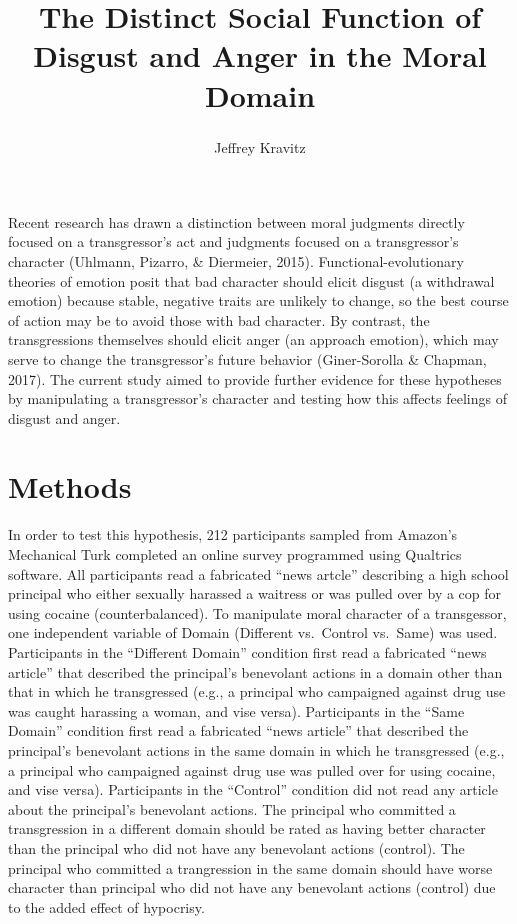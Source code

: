 \documentclass[man]{apa6}
\title{The Distinct Social Function of Disgust and Anger in the Moral Domain}
\author{Jeffrey Kravitz\textsuperscript{ }}
\date{}
\affiliation{
\vspace{0.5cm}
\textsuperscript{ } CUNY Brooklyn College}
\begin{document}
\maketitle

Recent research has drawn a distinction between moral judgments directly
focused on a transgressor's act and judgments focused on a
transgressor's character (Uhlmann, Pizarro, \& Diermeier, 2015).
Functional-evolutionary theories of emotion posit that bad character
should elicit disgust (a withdrawal emotion) because stable, negative
traits are unlikely to change, so the best course of action may be to
avoid those with bad character. By contrast, the transgressions
themselves should elicit anger (an approach emotion), which may serve to
change the transgressor's future behavior (Giner-Sorolla \& Chapman,
2017). The current study aimed to provide further evidence for these
hypotheses by manipulating a transgressor's character and testing how
this affects feelings of disgust and anger.

\section{Methods}\label{methods}

In order to test this hypothesis, 212 participants sampled from Amazon's
Mechanical Turk completed an online survey programmed using Qualtrics
software. All participants read a fabricated \enquote{news artcle}
describing a high school principal who either sexually harassed a
waitress or was pulled over by a cop for using cocaine
(counterbalanced). To manipulate moral character of a transgessor, one
independent variable of Domain (Different vs.~Control vs.~Same) was
used. Participants in the \enquote{Different Domain} condition first
read a fabricated \enquote{news article} that described the principal's
benevolant actions in a domain other than that in which he transgressed
(e.g., a principal who campaigned against drug use was caught harassing
a woman, and vise versa). Participants in the \enquote{Same Domain}
condition first read a fabricated \enquote{news article} that described
the principal's benevolant actions in the same domain in which he
transgressed (e.g., a principal who campaigned against drug use was
pulled over for using cocaine, and vise versa). Participants in the
\enquote{Control} condition did not read any article about the
principal's benevolant actions. The principal who committed a
transgression in a different domain should be rated as having better
character than the principal who did not have any benevolant actions
(control). The principal who committed a trangression in the same domain
should have worse character than principal who did not have any
benevolant actions (control) due to the added effect of hypocrisy.
\end{document}
